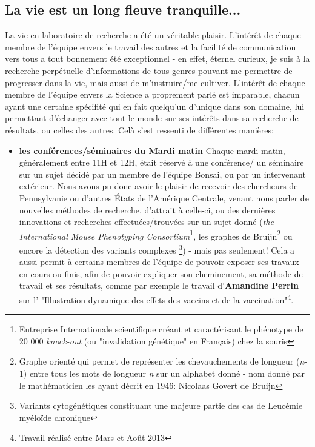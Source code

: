 \documentclass[12pt]{report}
\begin{document}
\begin{spacing}{1.2}
\section{La vie est un long fleuve tranquille...}

La vie en laboratoire de recherche a été un véritable plaisir.
\newline
L'intérêt de chaque membre de l'équipe envers le travail des autres et la facilité de communication vers tous a tout bonnement été exceptionnel - en effet, éternel curieux, je suis à la recherche perpétuelle d'informations de tous genres pouvant me permettre de progresser dans la vie, mais aussi de m'instruire/me cultiver. L'intérêt de chaque membre de l'équipe envers la Science a proprement parlé est imparable, chacun ayant une certaine spécifité qui en fait quelqu'un d'unique dans son domaine, lui permettant d'échanger avec tout le monde sur ses intérêts dans sa recherche de résultats, ou celles des autres.
\newline
Celà s'est ressenti de différentes manières:
\begin{itemize}
\item \textbf{les conférences/séminaires du Mardi matin}
	\newline
	Chaque mardi matin, généralement entre 11H et 12H, était réservé à une conférence/ un séminaire sur un sujet décidé par un membre de l'équipe Bonsai, ou par un intervenant extérieur.
	\newline
	Nous avons pu donc avoir le plaisir de recevoir des chercheurs de Pennsylvanie ou d'autres États de l'Amérique Centrale, venant nous parler de nouvelles méthodes de recherche, d'attrait à celle-ci, ou des dernières innovations et recherches effectuées/trouvées sur un sujet donné (\textit{the International Mouse Phenotyping Consortium}\footnote{Entreprise Internationale scientifique créant et caractérisant le phénotype de 20 000 \textit{knock-out} (ou "invalidation génétique" en Français) chez la souris}, les graphes de Bruijn\footnote{Graphe orienté qui permet de représenter les chevauchements de longueur (\textit{n}-1) entre tous les mots de longueur \textit{n} sur un alphabet donné - nom donné par le mathématicien les ayant décrit en 1946: Nicolaas Govert de Bruijn} ou encore la détection des variants complexes \footnote{Variants cytogénétiques constituant une majeure partie des cas de Leucémie myéloïde chronique}) -  mais pas seulement!
	\newline
	Cela a aussi permit à certains membres de l'équipe de pouvoir exposer ses travaux en cours ou finis, afin de pouvoir expliquer son cheminement, sa méthode de travail et ses résultats, comme par exemple le travail d'\textbf{Amandine Perrin} sur l' "Illustration dynamique des effets des vaccins et de la vaccination"\footnote{Travail réalisé entre Mars et Août 2013}.

\end{itemize}
\end{spacing}
\end{document}
